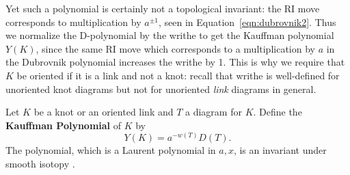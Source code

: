 Yet such a polynomial is certainly not a topological invariant: the RI move corresponds to multiplication by $a^{\pm 1}$, seen in Equation~\ref{eqn:dubrovnik2}. Thus we normalize the D-polynomial by the writhe to get the Kauffman polynomial $Y(K)$, since the same RI move which corresponds to a multiplication by $a$ in the Dubrovnik polynomial increases the writhe by 1. This is why we require that $K$ be oriented if it is a link and not a knot: recall that writhe is well-defined for unoriented knot diagrams but not for unoriented \emph{link} diagrams in general.
\begin{definition}
    Let $K$ be a knot or an oriented link and $T$ a diagram for $K$. Define the \textbf{Kauffman Polynomial} of $K$ by
    \[
        Y(K) = a^{-w(T)} D(T).
    \]
    The polynomial, which is a Laurent polynomial in $a, x$, is an invariant under smooth isotopy \cite{kauffman}.
\end{definition}

